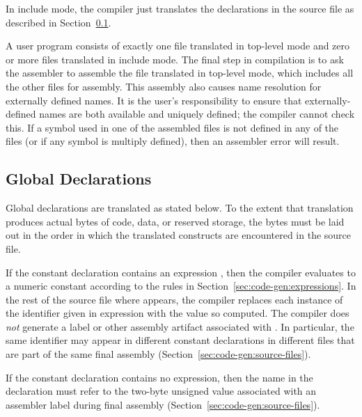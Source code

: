 \documentclass[10pt]{article}
\begin{document}
 In include mode, the compiler just translates
the declarations in the source file as described in
Section~\ref{sec:code-gen:global-decls}.

 A user program consists
of exactly one file translated in top-level mode and zero or more
files translated in include mode.  The final step in compilation is to
ask the assembler to assemble the file translated in top-level mode,
which includes all the other files for assembly.  This assembly also
causes name resolution for externally defined names.  It is the user's
responsibility to ensure that externally-defined names are both
available and uniquely defined; the compiler cannot check this.  If a
symbol used in one of the assembled files is not defined in any of the
files (or if any symbol is multiply defined), then an assembler error
will result.

\subsection{Global Declarations}
\label{sec:code-gen:global-decls}

Global declarations are translated as stated below.  To the extent
that translation produces actual bytes of code, data, or reserved
storage, the bytes must be laid out in the order in which the
translated constructs are encountered in the source file.

 If the constant declaration
 contains an expression , then the
compiler evaluates  to a numeric constant according to
the rules in Section~\ref{sec:code-gen:expressions}.  In the rest of
the source file where  appears, the compiler
replaces each instance of the identifier given in 
expression with the value so computed.  The compiler does \emph{not}
generate a label or other assembly artifact associated with
.  In particular, the same identifier may appear
in different constant declarations in different files that are part of
the same final assembly (Section~\ref{sec:code-gen:source-files}).

If the constant declaration contains no expression, then the name in
the declaration must refer to the two-byte unsigned value associated
with an assembler label during final assembly
(Section~\ref{sec:code-gen:source-files}).
\end{document}
